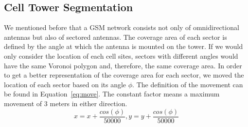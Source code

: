 \documentclass[master,english]{hgbthesis}
\begin{document}
\subsection{Cell Tower Segmentation}
We mentioned before that a GSM network consists not only of omnidirectional antennas but also of sectored antennas. The coverage area of each sector is defined by the angle at which the antenna is mounted on the tower. If we would only consider the location of each cell sites, sectors with different angles would have the same Voronoi polygon and, therefore, the same coverage area. In order to get a better representation of the coverage area for each sector, we moved the location of each sector based on its angle $\phi$. The definition of the movement can be found in Equation~\ref{eq:move}. The constant factor means a maximum movement of 3 meters in either direction.
\begin{equation}
	\label{eq:move}
	x=x+\frac{cos(\phi)}{50000},y=y+\frac{cos(\phi)}{50000}
\end{equation}
\end{document}
